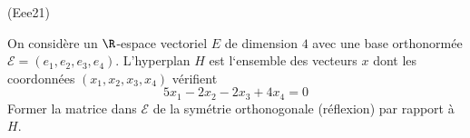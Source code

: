 \begin{tiny}(Eee21)\end{tiny} On considère un $\R$-espace vectoriel $E$ de dimension $4$ avec une base orthonormée $\mathcal{E}=(e_1,e_2,e_3,e_4)$. L'hyperplan $H$ est l`ensemble des vecteurs $x$ dont les coordonnées $(x_1,x_2,x_3,x_4)$ vérifient
\begin{displaymath}
 5x_1-2x_2-2x_3+4x_4 = 0
\end{displaymath}
 Former la matrice dans $\mathcal{E}$ de la symétrie orthonogonale (réflexion) par rapport à $H$.